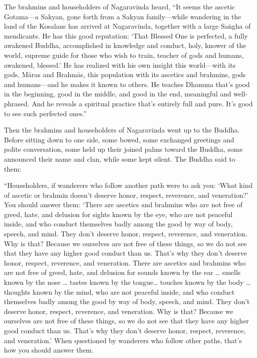 \documentclass[12pt,openany]{book}%
\begin{document}
The brahmins and householders of Nagaravinda heard, “It seems the ascetic Gotama—a Sakyan, gone forth from a Sakyan family—while wandering in the land of the Kosalans has arrived at Nagaravinda, together with a large \textsanskrit{Saṅgha} of mendicants. He has this good reputation: ‘That Blessed One is perfected, a fully awakened Buddha, accomplished in knowledge and conduct, holy, knower of the world, supreme guide for those who wish to train, teacher of gods and humans, awakened, blessed.’ He has realized with his own insight this world—with its gods, \textsanskrit{Māras} and \textsanskrit{Brahmās}, this population with its ascetics and brahmins, gods and humans—and he makes it known to others. He teaches Dhamma that’s good in the beginning, good in the middle, and good in the end, meaningful and well-phrased. And he reveals a spiritual practice that’s entirely full and pure. It’s good to see such perfected ones.” 

Then the brahmins and householders of Nagaravinda went up to the Buddha. Before sitting down to one side, some bowed, some exchanged greetings and polite conversation, some held up their joined palms toward the Buddha, some announced their name and clan, while some kept silent. The Buddha said to them: 

“Householders, if wanderers who follow another path were to ask you: ‘What kind of ascetic or brahmin doesn’t deserve honor, respect, reverence, and veneration?’ You should answer them: ‘There are ascetics and brahmins who are not free of greed, hate, and delusion for sights known by the eye, who are not peaceful inside, and who conduct themselves badly among the good by way of body, speech, and mind. They don’t deserve honor, respect, reverence, and veneration. Why is that? Because we ourselves are not free of these things, so we do not see that they have any higher good conduct than us. That’s why they don’t deserve honor, respect, reverence, and veneration. There are ascetics and brahmins who are not free of greed, hate, and delusion for sounds known by the ear … smells known by the nose … tastes known by the tongue… touches known by the body … thoughts known by the mind, who are not peaceful inside, and who conduct themselves badly among the good by way of body, speech, and mind. They don’t deserve honor, respect, reverence, and veneration. Why is that? Because we ourselves are not free of these things, so we do not see that they have any higher good conduct than us. That’s why they don’t deserve honor, respect, reverence, and veneration.’ When questioned by wanderers who follow other paths, that’s how you should answer them. 
\end{document}
